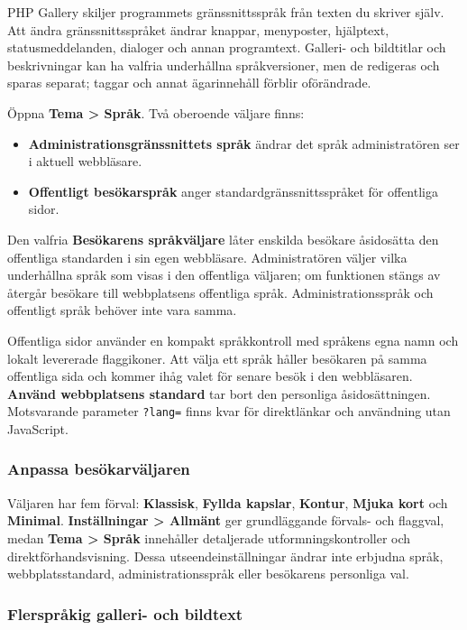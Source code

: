 \documentclass[11pt,a4paper]{article}
\newcommand{\ui}[1]{\textbf{#1}}
\newcommand{\codeword}[1]{\nolinkurl{#1}}
\begin{document}
PHP Gallery skiljer programmets gränssnittsspråk från texten du skriver själv.
Att ändra gränssnittsspråket ändrar knappar, menyposter, hjälptext,
statusmeddelanden, dialoger och annan programtext. Galleri- och bildtitlar och
beskrivningar kan ha valfria underhållna språkversioner, men de redigeras och
sparas separat; taggar och annat ägarinnehåll förblir oförändrade.

Öppna \ui{Tema > Språk}. Två oberoende väljare finns:

\begin{itemize}
  \item \ui{Administrationsgränssnittets språk} ändrar det språk administratören
  ser i aktuell webbläsare.
  \item \ui{Offentligt besökarspråk} anger standardgränssnittsspråket för
  offentliga sidor.
\end{itemize}

Den valfria \ui{Besökarens språkväljare} låter enskilda besökare åsidosätta den
offentliga standarden i sin egen webbläsare. Administratören väljer vilka
underhållna språk som visas i den offentliga väljaren; om funktionen stängs av
återgår besökare till webbplatsens offentliga språk. Administrationsspråk och
offentligt språk behöver inte vara samma.

Offentliga sidor använder en kompakt språkkontroll med språkens egna namn och
lokalt levererade flaggikoner. Att välja ett språk håller besökaren på samma
offentliga sida och kommer ihåg valet för senare besök i den webbläsaren.
\ui{Använd webbplatsens standard} tar bort den personliga åsidosättningen.
Motsvarande parameter \codeword{?lang=} finns kvar för direktlänkar och
användning utan JavaScript.

\subsubsection{Anpassa besökarväljaren}

Väljaren har fem förval: \ui{Klassisk}, \ui{Fyllda kapslar}, \ui{Kontur},
\ui{Mjuka kort} och \ui{Minimal}. \ui{Inställningar > Allmänt} ger grundläggande
förvals- och flaggval, medan \ui{Tema > Språk} innehåller detaljerade
utformningskontroller och direktförhandsvisning. Dessa utseendeinställningar
ändrar inte erbjudna språk, webbplatsstandard, administrationsspråk eller
besökarens personliga val.

\subsubsection{Flerspråkig galleri- och bildtext}
\end{document}

